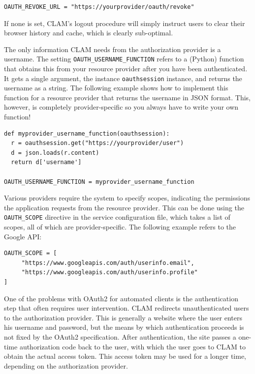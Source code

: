 \documentclass[a4paper,12pt]{report}
\begin{document}
\begin{verbatim}
OAUTH_REVOKE_URL = "https://yourprovider/oauth/revoke"
\end{verbatim}

If none is set, CLAM's logout procedure will simply instruct users to clear
their browser history and cache, which is clearly sub-optimal.

The only information CLAM needs from the authorization provider is a username.
The setting \texttt{OAUTH\_USERNAME\_FUNCTION} refers to a (Python) function
that obtains this from your resource provider after you have been
authenticated. It gets a single argument, the instance \texttt{oauthsession}
instance, and returns the username as a string.  The following example shows
how to implement this function for a resource provider that returns the
username in JSON format. This, however, is completely provider-specific so
you always have to write your own function! 

\begin{verbatim}
def myprovider_username_function(oauthsession):
  r = oauthsession.get("https://yourprovider/user")
  d = json.loads(r.content)
  return d['username']

OAUTH_USERNAME_FUNCTION = myprovider_username_function
\end{verbatim}

Various providers require the system to specify scopes, indicating the
permissions the application requests from the resource provider. This can be
done using the \texttt{OAUTH\_SCOPE} directive in the service configuration
file, which takes a list of scopes, all of which are provider-specific. The
following example refers to the Google API:

\begin{verbatim}
OAUTH_SCOPE = [
     "https://www.googleapis.com/auth/userinfo.email",
     "https://www.googleapis.com/auth/userinfo.profile"
]
\end{verbatim}

One of the problems with OAuth2 for automated clients is the authentication
step that often requires user intervention. CLAM redirects unauthenticated
users to the authorization provider. This is generally a website where the user
enters his username and password, but the means by which authentication
proceeds is not fixed by the OAuth2 specification. After authentication, the
site passes a one-time authorization code back to the user, with which the user
goes to CLAM to obtain the actual access token. This access token may be used
for a longer time, depending on the authorization provider.
\end{document}
